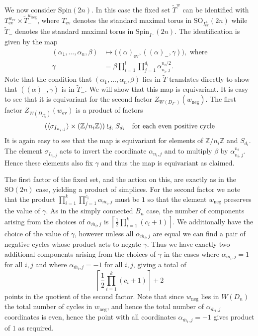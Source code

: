 \documentclass[11pt,a4paper]{article}
\def\Spin{\mathrm{Spin}}
\def\SO{\mathrm{SO}}
\def\Z{\mathbb{Z}}
\def\mbar{\overline{m}}
\def\mbar{\overline{m}}
\def\coveringtorus{\tilde{T}}
\def\ev{\mathrm{ev}}
\def\neg{\mathrm{neg}}
\begin{document}
\bigskip

We now consider $\Spin(2n)$. In this case the fixed set $\coveringtorus^w$ can be identified with $T_\ev^{w_{\ev}}\times \coveringtorus^{w_\neg}_-$, where $T_\ev$ denotes the standard maximal torus in $\SO_{I^+_{\ev}}(2n)$ while $\coveringtorus_-$ denotes the standard maximal torus in $\Spin_{I^-}(2n)$. The identification is given by the map
\begin{align*}
(\alpha_1,\dots,\alpha_n,\beta) &\mapsto \big((\alpha)_{\ev},((\alpha)_-,\gamma)\big), \text{ where}\\
\gamma&=\beta\prod_{i=1}^l\prod_{j=1}^{d_i}\alpha_{n_i,j}^{n_i/2}.
\end{align*}
Note that the condition that $(\alpha_1,\dots, \alpha_n,\beta)$ lies in $\coveringtorus$ translates directly to show that $((\alpha)_-,\gamma)$ is in $\coveringtorus_-$. We will show that this map is equivariant.  It is easy to see that it is equivariant for the second factor $Z_{W(D_{I^-})}(w_\neg)$. The first factor $Z_{W(D_{I^+_{\ev}})}(w_{\ev})$ is a product of factors
\[
(\langle \sigma_{I_{n_i,j}}\rangle \times (\Z/n_i\Z))\wr_{d_i}S_{d_i} \quad\text{for each even positive cycle}\\
\]
It is again easy to see that the map is equivariant for elements of $\Z/n_i\Z$ and $S_{d_i}$. The element $\sigma_{I_{n_i,j}}$ acts to invert the coordinate $\alpha_{n_i,j}$ and to multiply $\beta$ by $\alpha_{n_i,j}^{n_i}$. Hence these elements also fix $\gamma$ and thus the map is equivariant as claimed.




The first factor of the fixed set, and the action on this, are exactly as in the $\SO(2n)$ case, yielding a product of simplices. For the second factor we note that the product $\prod_{i=1}^k\prod_{j=1}^{c_i}\alpha_{\mbar_i,j}$ must be $1$ so that the element $w_\neg$ preserves the value of $\gamma$. As in the simply connected $B_n$ case, the number of components arising from the choices of $\alpha_{\mbar_i,j}$ is $\left\lceil \frac 12 \prod_{i=1}^k (c_i+1)\right\rceil$. We additionally have the choice of the value of $\gamma$, however unless all $\alpha_{\mbar_i,j}$ are equal we can find a pair of negative cycles whose product acts to negate $\gamma$. Thus we have exactly two additional components arising from the choices of $\gamma$ in the cases where $\alpha_{\mbar_i,j}=1$ for all $i,j$ and where $\alpha_{\mbar_i,j}=-1$ for all $i,j$, giving a total of
\[
\left\lceil \frac 12 \prod_{i=1}^k (c_i+1)\right\rceil +2
\]
points in the quotient of the second factor.  Note that since $w_\neg$ lies in $W(D_n)$ the total number of cycles in $w_\neg$, and hence the total number of $\alpha_{\mbar_i,j}$ coordinates is even, hence the point with all coordinates $\alpha_{\mbar_i,j}=-1$ gives product of $1$ as required.
\end{document}
